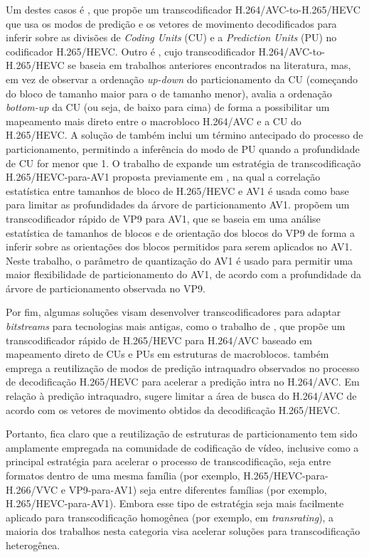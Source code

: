 Um destes casos é \citet{bib:zhang_2012}, que propõe um transcodificador H.264/AVC-to-H.265/HEVC que usa os modos de predição e os vetores de movimento decodificados para inferir sobre as divisões de \textit{Coding Units} (CU) e a \textit{Prediction Units} (PU) no codificador H.265/HEVC. Outro é \citet{bib:franche_2015}, cujo transcodificador H.264/AVC-to-H.265/HEVC se baseia em trabalhos anteriores encontrados na literatura, mas, em vez de observar a ordenação \textit{up-down} do particionamento da CU (começando do bloco de tamanho maior para o de tamanho menor), avalia a ordenação \textit{bottom-up} da CU (ou seja, de baixo para cima) de forma a possibilitar um mapeamento mais direto entre o macrobloco H.264/AVC e a CU do H.265/HEVC. A solução de \citet{bib:franche_2015} também inclui um término antecipado do processo de particionamento, permitindo a inferência do modo de PU quando a profundidade de CU for menor que 1. O trabalho de \citet{bib:borges2_2021} expande um estratégia de transcodificação H.265/HEVC-para-AV1 proposta previamente em \citet{bib:borges_2019}, na qual a correlação estatística entre tamanhos de bloco de H.265/HEVC e AV1 é usada como base para limitar as profundidades da árvore de particionamento AV1. \citet{bib:borges_2021} propõem um transcodificador rápido de VP9 para AV1, que se baseia em uma análise estatística de tamanhos de blocos e de orientação dos blocos do VP9 de forma a inferir sobre as orientações dos blocos permitidos para serem aplicados no AV1. Neste trabalho, o parâmetro de quantização do AV1 é usado para permitir uma maior flexibilidade de particionamento do AV1, de acordo com a profundidade da árvore de particionamento observada no VP9. 

Por fim, algumas soluções visam desenvolver transcodificadores para adaptar \textit{bitstreams} para tecnologias mais antigas, como o trabalho de \citet{bib:tang_2015}, que propõe um transcodificador rápido de H.265/HEVC para H.264/AVC baseado em mapeamento direto de CUs e PUs em estruturas de macroblocos. \citet{bib:tang_2015} também emprega a reutilização de modos de predição intraquadro observados no processo de decodificação H.265/HEVC para acelerar a predição intra no H.264/AVC. Em relação à predição intraquadro, \citet{bib:tang_2015} sugere limitar a área de busca do H.264/AVC de acordo com os vetores de movimento obtidos da decodificação H.265/HEVC.

Portanto, fica claro que a reutilização de estruturas de particionamento tem sido amplamente empregada na comunidade de codificação de vídeo, inclusive como a principal estratégia para acelerar o processo de transcodificação, seja entre formatos dentro de uma mesma família (por exemplo, H.265/HEVC-para-H.266/VVC e VP9-para-AV1) seja entre diferentes famílias (por exemplo, H.265/HEVC-para-AV1). Embora esse tipo de estratégia seja mais facilmente aplicado para transcodificação homogênea (por exemplo, em \textit{transrating}), a maioria dos trabalhos nesta categoria visa acelerar soluções para transcodificação heterogênea.

